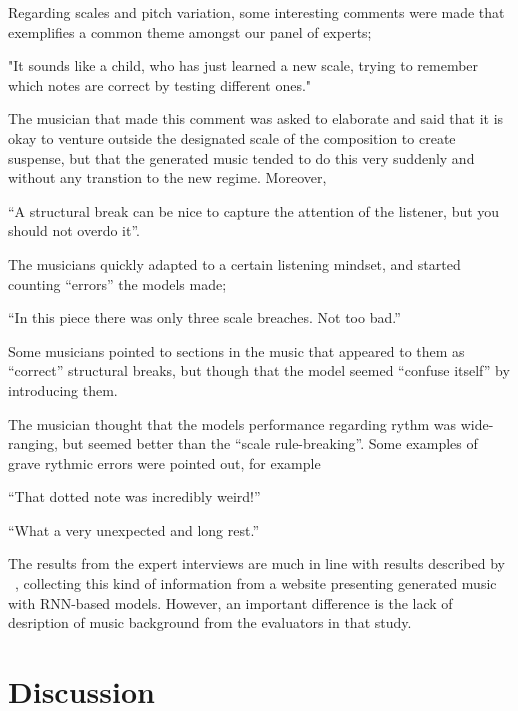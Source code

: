 \documentclass{IEEEtran}
\begin{document}
Regarding scales and pitch variation, some interesting comments were 
made that exemplifies a common theme amongst our panel of experts;
\begin{displayquote}
"It sounds like a child, who has just learned a new scale, trying 
to remember which notes are correct by testing different ones." 
\end{displayquote}
The musician that made this comment was asked to elaborate and 
said that it is okay to venture outside the designated scale of the 
composition to create suspense, but that the generated music tended 
to do this very suddenly and without any transtion to the new 
regime. Moreover,
\begin{displayquote} 
``A structural break
can be nice to capture the attention of the listener, but you should
not overdo it''. 
\end{displayquote}
The musicians quickly adapted to a certain listening mindset, and
started counting ``errors'' the models made;
\begin{displayquote}
``In this piece there was 
only three scale breaches. Not too bad.''   
\end{displayquote}
Some musicians pointed to sections 
in the music that appeared to them as ``correct'' structural breaks, but 
though that the model seemed ``confuse itself'' by introducing them.

The musician thought that the models performance regarding rythm 
was wide-ranging, but seemed better than the ``scale rule-breaking''.
Some examples of grave rythmic errors were pointed out, for example
\begin{displayquote}
 ``That dotted note was incredibly weird!''   
\end{displayquote}
\begin{displayquote}
``What a very unexpected and
long rest.''   
\end{displayquote}

The results from the expert interviews are much in line with results described 
by \citeauthor{sturm2017taking} ~\cite{sturm2017taking}, collecting this kind 
of information from a website presenting generated 
music with RNN-based models. However, an important difference is the lack of 
desription of music background from the evaluators in that study. 

\section{Discussion}
\end{document}

